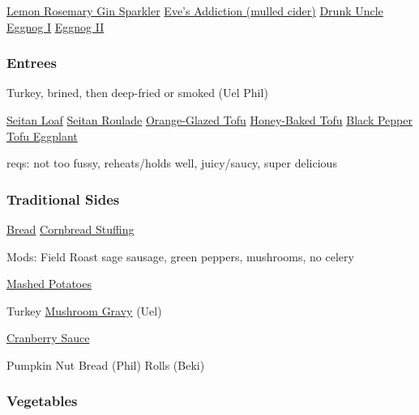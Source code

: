 \begin{centering}
 \href{https://www.seriouseats.com/recipes/2014/11/gin-cocktail-for-crowds-charred-lemon-rosemary-drink-recipe.html}{Lemon Rosemary Gin Sparkler} \blt
 \href{https://www.seriouseats.com/recipes/2013/11/eves-addiction-hot-mulled-cider-recipe.html}{Eve's Addiction (mulled cider)} \blt
 \href{https://www.seriouseats.com/recipes/2016/10/drunk-uncle-scotch-cynar-negroni-cocktail-recipe.html}{Drunk Uncle} \blt
 \hyperref[Eggnog I]{Eggnog I} \blt
 \hyperref[Eggnog II]{Eggnog II}

 \subsubsection*{Entrees}

 Turkey, brined, then deep-fried or smoked (Uel \And Phil)

 \href{http://www.theppk.com/2011/11/seitan-roast-stuffed-with-shiitakes-and-leeks/}{Seitan Loaf} \blt
 \href{https://olivesfordinner.com/2011/11/seitan-roulade-with-sage-and-swee.html}{Seitan Roulade} \blt
 \hyperref[Orange-Glazed Tofu]{Orange-Glazed Tofu} \blt
 \href{https://www.theppk.com/2016/12/sweet-smoky-glazed-tofu-ham/}{Honey-Baked Tofu} \blt
 \href{https://smittenkitchen.com/2019/08/black-pepper-tofu-and-eggplant/}{Black Pepper Tofu \And Eggplant}

 reqs: not too fussy, reheats/holds well, juicy/saucy, super delicious

 \subsubsection*{Traditional Sides}

 \hyperref[Bread Stuffing]{Bread} \blt \href{https://www.seriouseats.com/recipes/2015/11/cornbread-stuffing-sausage-sage-recipe.html}{Cornbread Stuffing}

 Mods: Field Roast sage sausage, green peppers, mushrooms, no celery

 \href{https://www.foodnetwork.com/recipes/alton-brown/creamy-mashed-potatoes-recipe-1956220}{Mashed Potatoes}

 Turkey \blt \href{https://www.kitchentreaty.com/vegetarian-onion-gravy/}{Mushroom Gravy} (Uel)

 \hyperref[Cranberry Sauce]{Cranberry Sauce}

 Pumpkin Nut Bread (Phil) \blt Rolls (Beki)

 \subsubsection*{Vegetables}


\end{centering}
